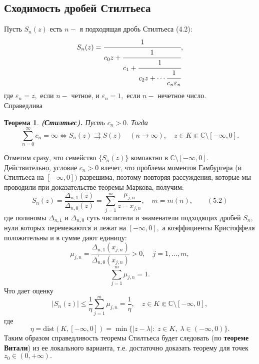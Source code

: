 \documentclass[12pt,a4paper]{article}
\theoremstyle{plain}   \newtheorem{Pro}{Задача}
\newtheorem{The}{Теорема}
\begin{document}
\subsection{Сходимость дробей Стилтьеса}
Пусть
$ S_n (z) $
есть
$ n- $
я подходящая дробь Стилтьеса (4.2):
\begin{equation*}
  S_n (z) =
    \cfrac{1}{c_0 z+
	  \cfrac{1}{c_1 +
	    \cfrac{1}{c_2 z + \dotsb
		  \cfrac{1}{c_n \varepsilon _n
  }}}},
\end{equation*}
где
$ \varepsilon _n =z, $
если
$ n - $
четное, и
$ \varepsilon _n =1, $
если
$ n - $
нечетное число.\\
Справедлива
\begin{The}
{\bfseries (Стилтьес).}
Пусть
$ c_n >0 . $
Тогда
\begin{equation*}
  \sum _{n=0}^{\infty} c_n = \infty \Longleftrightarrow
    S_n (z) \rightrightarrows S(z) \quad ( n \rightarrow \infty ) ,
	 \quad z \in K \Subset \mathbb{C}
	 \setminus [-\infty , 0].
\end{equation*}
\end{The}
Отметим сразу, что семейство
$ \{ S_n (z) \} $
компактно в
$ \mathbb{C} \setminus [-\infty , 0]. $
Действительно, условие
$ c_n >0 $
влечет, что проблема моментов Гамбургера
(и Стилтьеса на
$ [-\infty , 0] ) $
разрешима, поэтому повторяя рассуждения,
которые мы проводили при доказательстве теоремы
Маркова, получим:
\begin{equation*}
  S_n (z)=
    \frac{\Delta _{n,1}(z)}{\Delta _{n,0}(z)}=
	  \sum _{j=1}^m
	    \frac{\mu _{j,n}}{z-x_{j,n}},
		  \quad m=m(n), \qquad (5.2)
\end{equation*}
где полиномы
$ \Delta _{n,1} $
и
$ \Delta _{n,0} $
суть числители и знаменатели подходящих дробей
$ S_n , $
нули которых перемежаются и лежат на
$ [-\infty , 0] , $
а коэффициенты Кристоффеля положительны и в сумме дают единицу:
$$
  \mu _{j,n}=\frac{\Delta _{n,1}(x_{j,n})}
    {\Delta _{n,0}^{\prime}(x_{j,n})}>0 ,
	  \quad j=1,...,m,
$$
$$
  \sum _{j=1}^m \mu _{j,n}=1.
$$
Что дает оценку
$$
  |S_n (z)| \leqslant \frac{1}{\eta}
    \sum _{j=1}^m \mu _{j,n} =
	  \frac{1}{\eta}, \quad
	    z \in K \Subset \mathbb{C} \setminus [-\infty , 0],
$$
где
$$
  \eta =\mathrm{dist}(K,[-\infty , 0])=
    \min \{ |z-\lambda |: \; z \in K, \;
	  \lambda \in (-\infty , 0) \} .
$$
Таким образом справедливость теоремы Стилтьеса
будет следовать (по
{\bfseries теореме Витали})
из ее локального варианта, т.е. достаточно доказать
теорему для точек
$ z_0 \in (0,+\infty ) . $
\end{document}
